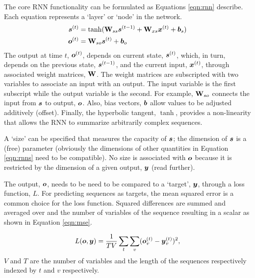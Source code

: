 The core RNN functionality can be formulated as Equations \ref{eqn:rnn} describe. Each equation represents a `layer' or `node' in the network.
\begin{subequations}  
  \label{eqn:rnn}
  \begin{align}
    \boldsymbol{s}\sp{(t)}&=
              \mathrm{\tanh}(
              \mathbf{W}_{ss}
              \boldsymbol{s}\sp{(t-1)}
              +
              \mathbf{W}_{xs}
              \boldsymbol{x}\sp{(t)}
              +
              \boldsymbol{b}_s
              ) 
              \label{eqn:rnns} \\ 
    \boldsymbol{o}\sp{(t)}&=
             \mathbf{W}_{so}
             \boldsymbol{s}\sp{(t)}
             +
             \boldsymbol{b}_{o}
             \label{eqn:rnno}
  \end{align}
\end{subequations}
\noindent 
The output at time $t$, $\boldsymbol{o}\sp{(t)}$, depends on current state, $\boldsymbol{s}\sp{(t)}$, which, in turn, depends on the previous state, $\boldsymbol{s}\sp{(t-1)}$, and the current input, $\boldsymbol{x}\sp{(t)}$, through associated weight matrices, $\mathbf{W}$. The weight matrices are subscripted with two variables to associate an input with an output. The input variable is the first subscript while the output variable is the second. For example, $\mathbf{W}_{so}$ connects the input from $\boldsymbol{s}$ to output, $\boldsymbol{o}$. Also, bias vectors, $\boldsymbol{b}$ allow values to be adjusted additively (offset). Finally, the hyperbolic tangent, $\tanh$, provides a non-linearity that allows the RNN to summarize arbitrarily complex sequences.

A `size' can be specified that measures the capacity of $\boldsymbol{s}$; the dimension of $\boldsymbol{s}$ is a (free) parameter (obviously the dimensions of other quantities in Equation \ref{eqn:rnns} need to be compatible).
%
No size is associated with $\boldsymbol{o}$ because it is restricted by the dimension of a given output, $\boldsymbol{y}$ (read further).

The output, $\boldsymbol{o}$, needs to be need to be compared to a `target', $\boldsymbol{y}$, through a loss function, $L$. For predicting sequences as targets, the mean squared error is a common choice for the loss function. Squared differences are summed and averaged over and the number of variables of the sequence resulting in a scalar as shown in Equation \ref{eqn:mse}.

\begin{equation}
  \label{eqn:mse}
  L(\boldsymbol{o},\boldsymbol{y}) = \frac{1}{TV} \sum_t \sum_v(
  \boldsymbol{o}\sp{(t)}_v - \boldsymbol{y}\sp{(t)}_v
  )^2,
\end{equation}
\noindent
$V$ and $T$ are the number of variables and the length of the sequences respectively indexed by $t$ and $v$ respectively.

